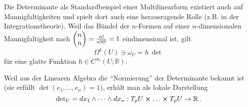 \documentclass[../H_Analysis_main.tex]{subfiles}
\begin{document}
\begin{bsp}[Determinante]
Die Determinante als Standardbeispiel einer Multilinearform existiert auch auf Mannigfaltigkeiten und spielt dort auch eine herausragende Rolle (z.B. in der Integrationstheorie). Weil das Bündel der $n$-Formen auf einer $n$-dimensionalen Mannigfaltigkeit nach $\mqty(n \\ n) = \frac{n!}{n! 0!} = 1$ eindimensional ist, gilt
\begin{equation}
\Omega^k(U) \ni \omega_U = h \, \det
\end{equation}
für eine glatte Funktion $h \in C^\infty(U; \mathbb{R})$.

Weil aus der Linearen Algebra die \enquote{Normierung} der Determinante bekannt ist (sie erfüllt $\det(e_1, \dots, e_n) = 1$), erhält man als lokale Darstellung
\begin{equation}
\text{det}_U = dx_1 \wedge \dots \wedge dx_n: T_p U \cross \dots \cross T_p U \rightarrow \mathbb{R} \, .
\end{equation}
\end{bsp}
\end{document}
